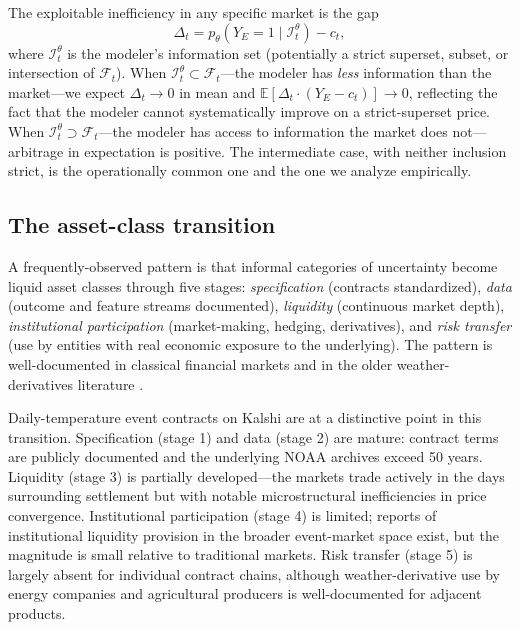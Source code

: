 \documentclass[11pt]{article}
\begin{document}
The exploitable inefficiency in any specific market is the gap
\begin{equation}
\Delta_t = p_\theta(Y_E = 1 \mid \mathcal{I}_t^\theta) - c_t,
\label{eq:delta}
\end{equation}
where $\mathcal{I}_t^\theta$ is the modeler's information set (potentially
a strict superset, subset, or intersection of $\mathcal{F}_t$). When
$\mathcal{I}_t^\theta \subset \mathcal{F}_t$---the modeler has \emph{less}
information than the market---we expect $\Delta_t \to 0$ in mean and
$\mathbb{E}[\Delta_t \cdot (Y_E - c_t)] \to 0$, reflecting the fact that
the modeler cannot systematically improve on a strict-superset price.
When $\mathcal{I}_t^\theta \supset \mathcal{F}_t$---the modeler has access
to information the market does not---arbitrage in expectation is positive.
The intermediate case, with neither inclusion strict, is the operationally
common one and the one we analyze empirically.

\subsection{The asset-class transition}

A frequently-observed pattern is that informal categories of uncertainty
become liquid asset classes through five stages: \emph{specification}
(contracts standardized), \emph{data} (outcome and feature streams
documented), \emph{liquidity} (continuous market depth), \emph{institutional
participation} (market-making, hedging, derivatives), and \emph{risk
transfer} (use by entities with real economic exposure to the underlying).
The pattern is well-documented in classical financial markets
\citep{maccheroni2009portfolio,lopez2018advances} and in the older
weather-derivatives literature \citep{hong2016probabilistic}.

Daily-temperature event contracts on Kalshi are at a distinctive point in
this transition. Specification (stage 1) and data (stage 2) are mature:
contract terms are publicly documented and the underlying NOAA archives
exceed 50 years. Liquidity (stage 3) is partially developed---the markets
trade actively in the days surrounding settlement but with notable
microstructural inefficiencies in price convergence. Institutional
participation (stage 4) is limited; reports of institutional liquidity
provision in the broader event-market space exist, but the magnitude is
small relative to traditional markets. Risk transfer (stage 5) is largely
absent for individual contract chains, although weather-derivative use by
energy companies and agricultural producers \citep{noaalcd} is
well-documented for adjacent products.
\end{document}
